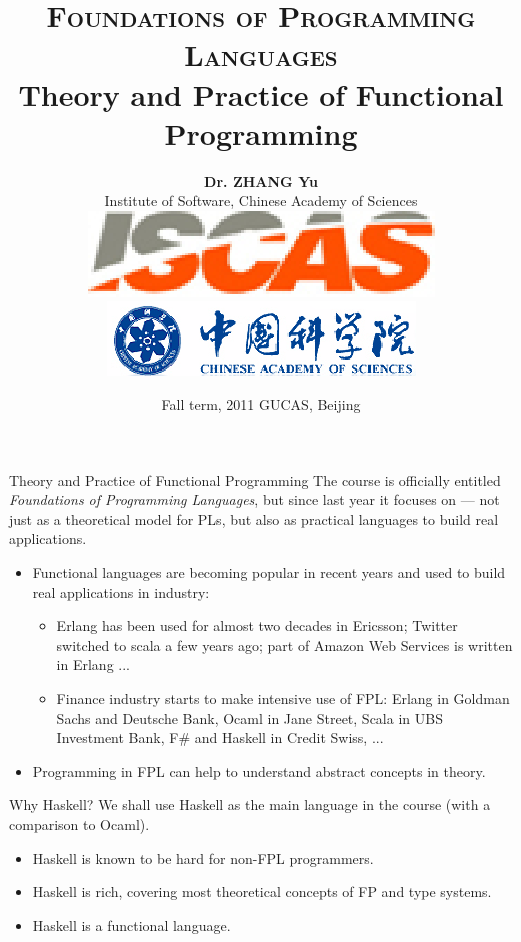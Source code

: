 \documentclass[paper=screen,mode=present,style=zysimple]{powerdot}
\title{{\small \textsc{Foundations of Programming Languages}}
\\[12pt]
{\Large \color{TitleColor} Theory and Practice of Functional Programming}
}
\author{\small \textbf{Dr. ZHANG Yu}
  \\[2pt] \small Institute of Software, Chinese Academy of Sciences 
  \\[5pt] \includegraphics[height=.04\slideheight]{iscas.eps} 
  \qquad \qquad 
  \includegraphics[height=.04\slideheight]{cas.eps}
}
\date{\scriptsize Fall term, 2011 \qquad GUCAS, Beijing}
\begin{document}
\maketitle 


\begin{slide}{Theory and Practice of Functional Programming}
The course is officially entitled {\em Foundations of Programming Languages}, but since last year it focuses on 
 --- not just as a theoretical model for PLs, but also as practical languages 
to build real applications.
\begin{itemize}
\item Functional languages are becoming popular in recent years and used to build real applications in industry:
\begin{itemize}
\item Erlang has been used for almost two decades in Ericsson; Twitter switched to scala a few years ago;  
  part of Amazon Web Services is written in Erlang ...
\item Finance industry starts to make intensive use of FPL: 
  Erlang in Goldman Sachs and Deutsche Bank, Ocaml in Jane Street, Scala in UBS Investment Bank, 
  F\# and Haskell in Credit Swiss, ...
\end{itemize}
\item Programming in FPL can help to understand abstract concepts in theory.
\end{itemize}
\end{slide}

\begin{slide}{Why Haskell?}
We shall use Haskell as the main language in the course (with a comparison to Ocaml).
\begin{itemize}
\item Haskell is known to be hard for non-FPL programmers.
\item Haskell is rich, covering most theoretical concepts of FP and type systems.
\item Haskell is a  functional language.
\end{itemize}
\end{slide}
\end{document}
